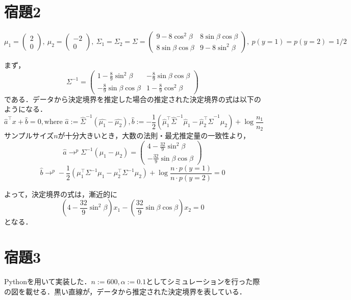 \documentclass[11pt,a4paper,dvipdfmx]{article}
\theoremstyle{plain}
\renewcommand{\hat}{\widehat}
\newcommand{\1}{\mbox{1}\hspace{-0.25em}\mbox{l}}
\begin{document}
\newpage
\section*{宿題2}
$$
\mu_1 = \left(
\begin{matrix}
	2  \\
	0
\end{matrix}
\right), \ 
\mu_2 = \left(
\begin{matrix}
	-2  \\
	0
\end{matrix}
\right), \ 
\Sigma_1 = \Sigma_2 = \Sigma =\left(
\begin{matrix}
	9 - 8 \cos^2 \beta & 8 \sin \beta \cos \beta  \\
	8 \sin \beta \cos \beta & 9 - 8 \sin^2 \beta 
\end{matrix}
\right), \
p(y=1) = p(y=2) = 1/2
$$

まず，
$$
\Sigma^{-1} = 
\left(
\begin{matrix}
	1 - \frac{8}{9} \sin^2 \beta & - \frac{8}{9} \sin \beta \cos \beta  \\
	- \frac{8}{9} \sin \beta \cos \beta  & 1 - \frac{8}{9} \cos^2 \beta 
\end{matrix}
\right)
$$
である．データから決定境界を推定した場合の推定された決定境界の式は以下のようになる．
$$
\hat{a}^\top x + \hat{b} = 0, 
\text{where } \hat{a}:=\hat{\Sigma}^{-1}(\hat{\mu_1} - \hat{\mu_2}), \hat{b}:= -\frac{1}{2}(\hat{\mu}_1^\top \hat{\Sigma}^{-1} \hat{\mu}_1 - \hat{\mu}_2^\top \hat{\Sigma}^{-1} \hat{\mu}_2) + \log \frac{n_1}{n_2}
$$
サンプルサイズ$n$が十分大きいとき，大数の法則・最尤推定量の一致性より，
$$
\hat{a} \to^p \Sigma^{-1}(\mu_1 - \mu_2) = 
\left(
\begin{matrix}
	4 - \frac{32}{9} \sin^2 \beta \\
	-\frac{32}{9}\sin \beta \cos \beta
\end{matrix}
\right)
$$
$$
\hat{b} \to^p -\frac{1}{2}(\mu_1^\top \Sigma^{-1} \mu_1 - \mu_2^\top \Sigma^{-1} \mu_2) + \log \frac{n \cdot p(y=1)}{n \cdot p(y=2)} = 0
$$

よって，決定境界の式は，漸近的に
$$
\left( 4 - \frac{32}{9} \sin^2 \beta \right) x_1 - \left( \frac{32}{9} \sin \beta \cos \beta \right)x_2 = 0
$$
となる．


\section*{宿題3}
Pythonを用いて実装した．$n := 600, \alpha := 0.1$としてシミュレーションを行った際の図を載せる．黒い直線が，データから推定された決定境界を表している．
\end{document}
